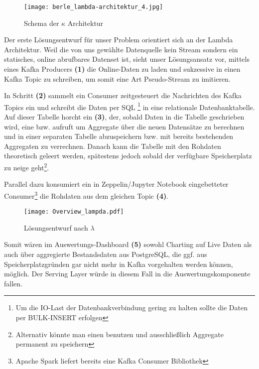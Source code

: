 \begin{description}
\begin{figure}[h]
	\centering
	\texttt{[image: berle\_lambda-architektur\_4.jpg]}
	\caption[Schema der $\kappa$ Architektur]{Schema der $\kappa$ Architektur\autocite{jaxkappa}}
	\label{fig:KappaArchitecture}
\end{figure}

\end{description}

Der erste Lösungsentwurf für unser Problem orientiert sich an der Lambda Architektur. Weil die von uns gewählte Datenquelle kein Stream sondern ein statisches, online abrufbares Datenset ist, sieht unser Lösungsansatz vor, mittels eines Kafka Producers \textbf{(1)} die Online-Daten zu laden und sukzessive in einen Kafka Topic zu schreiben, um somit eine Art Pseudo-Stream zu imitieren.

In Schritt \textbf{(2)} sammelt ein Consumer zeitgesteuert die Nachrichten des Kafka Topics ein und schreibt die Daten per SQL  \footnote{Um die IO-Last der Datenbankverbindung gering zu halten sollte die Daten per BULK-INSERT erfolgen} in eine relationale Datenbanktabelle. Auf dieser Tabelle horcht ein  \textbf{(3)}, der, sobald Daten in die Tabelle geschrieben wird, eine  bzw.  aufruft um Aggregate über die neuen Datensätze zu berechnen und in einer separaten Tabelle abzuspeichern bzw. mit bereits bestehenden Aggregaten zu verrechnen. Danach kann die Tabelle mit den Rohdaten theoretisch geleert werden, spätestens jedoch sobald der verfügbare Speicherplatz zu neige geht\footnote{Alternativ könnte man einen  benutzen und ausschließlich Aggregate permanent zu speichern}.

Parallel dazu konsumiert ein in Zeppelin/Jupyter Notebook eingebetteter Consumer\footnote{Apache Spark liefert bereits eine Kafka Consumer Bibliothek} die Rohdaten aus dem gleichen Topic \textbf{(4)}.

\begin{figure}[h] %
	\centering
	\texttt{[image: Overview\_lampda.pdf]}
	\caption[Lösungsentwurf nach $\lambda$]{Lösungsentwurf nach $\lambda$}
	\label{fig:OurLampdaArchitecture}
\end{figure}

Somit wären im Auswertungs-Dashboard \textbf{(5)} sowohl Charting auf Live Daten als auch über aggregierte Bestandsdaten aus PostgreSQL, die ggf. aus Speicherplatzgründen gar nicht mehr in Kafka vorgehalten werden können, möglich. Der Serving Layer würde in diesem Fall in die Auswertungskomponente fallen.


